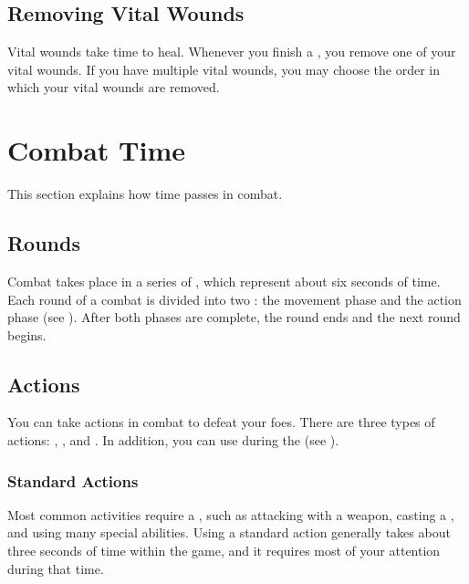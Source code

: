     \subsection{Removing Vital Wounds}\label{Removing Vital Wounds}
        Vital wounds take time to heal.
        Whenever you finish a , you remove one of your vital wounds.
        If you have multiple vital wounds, you may choose the order in which your vital wounds are removed.

\section{Combat Time}\label{Combat Time}
    This section explains how time passes in combat.

    \subsection{Rounds}\label{Rounds}

        Combat takes place in a series of , which represent about six seconds of time.
        Each round of a combat is divided into two : the movement phase and the action phase (see ).
        After both phases are complete, the round ends and the next round begins.

    \subsection{Actions}\label{Actions}

        You can take actions in combat to defeat your foes.
        There are three types of actions: , , and .
        In addition, you can use  during the  (see ).

        \subsubsection{Standard Actions}\label{Standard Actions}
            Most common activities require a , such as attacking with a weapon, casting a , and using many special abilities.
            Using a standard action generally takes about three seconds of time within the game, and it requires most of your attention during that time.

